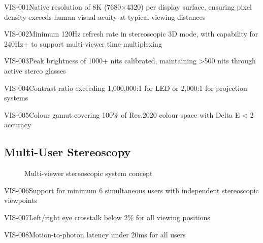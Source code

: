 \begin{requirement}{VIS-001}{Native resolution of 8K (7680×4320) per display surface, ensuring pixel density exceeds human visual acuity at typical viewing distances}

\begin{requirement}{VIS-002}{Minimum 120Hz refresh rate in stereoscopic 3D mode, with capability for 240Hz+ to support multi-viewer time-multiplexing}

\begin{requirement}{VIS-003}{Peak brightness of 1000+ nits calibrated, maintaining >500 nits through active stereo glasses}

\begin{requirement}{VIS-004}{Contrast ratio exceeding 1,000,000:1 for LED or 2,000:1 for projection systems}

\begin{requirement}{VIS-005}{Colour gamut covering 100\% of Rec.2020 colour space with Delta E < 2 accuracy}

\subsection{Multi-User Stereoscopy}

\begin{figure}[H]
\centering
{}
\caption{Multi-viewer stereoscopic system concept}
\end{figure}

\begin{requirement}{VIS-006}{Support for minimum 6 simultaneous users with independent stereoscopic viewpoints}

\begin{requirement}{VIS-007}{Left/right eye crosstalk below 2\% for all viewing positions}

\begin{requirement}{VIS-008}{Motion-to-photon latency under 20ms for all users}


\end{requirement}
\end{requirement}
\end{requirement}
\end{requirement}
\end{requirement}
\end{requirement}
\end{requirement}
\end{requirement}
